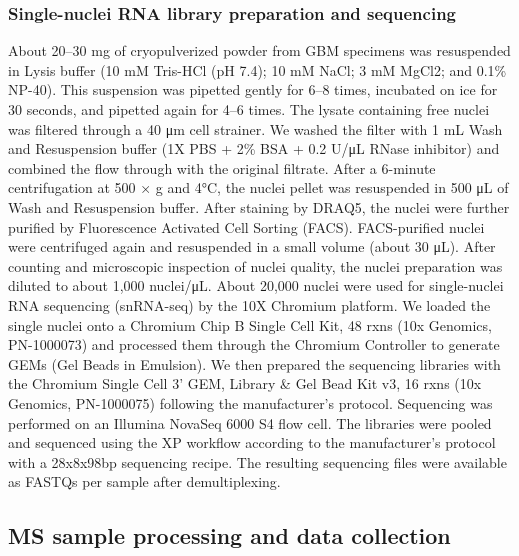 \subsubsection{Single-nuclei RNA library preparation and sequencing}
About 20--30 mg of cryopulverized powder from GBM specimens was resuspended in Lysis buffer (10 mM Tris-HCl (pH 7.4); 10 mM NaCl; 3 mM MgCl2; and 0.1\% NP-40). This suspension was pipetted gently for 6--8 times, incubated on ice for 30 seconds, and pipetted again for 4--6 times. The lysate containing free nuclei was filtered through a 40 μm cell strainer. We washed the filter with 1 mL Wash and Resuspension buffer (1X PBS + 2\% BSA + 0.2 U/μL RNase inhibitor) and combined the flow through with the original filtrate. After a 6-minute centrifugation at 500 × g and 4°C, the nuclei pellet was resuspended in 500 μL of Wash and Resuspension buffer. After staining by DRAQ5, the nuclei were further purified by Fluorescence Activated Cell Sorting (FACS). FACS-purified nuclei were centrifuged again and resuspended in a small volume (about 30 μL). After counting and microscopic inspection of nuclei quality, the nuclei preparation was diluted to about 1,000 nuclei/μL. About 20,000 nuclei were used for single-nuclei RNA sequencing (snRNA-seq) by the 10X Chromium platform. We loaded the single nuclei onto a Chromium Chip B Single Cell Kit, 48 rxns (10x Genomics, PN-1000073) and processed them through the Chromium Controller to generate GEMs (Gel Beads in Emulsion). We then prepared the sequencing libraries with the Chromium Single Cell 3' GEM, Library \& Gel Bead Kit v3, 16 rxns (10x Genomics, PN-1000075) following the manufacturer’s protocol. Sequencing was performed on an Illumina NovaSeq 6000 S4 flow cell. The libraries were pooled and sequenced using the XP workflow according to the manufacturer's protocol with a 28x8x98bp sequencing recipe. The resulting sequencing files were available as FASTQs per sample after demultiplexing.


\subsection{MS sample processing and data collection}

